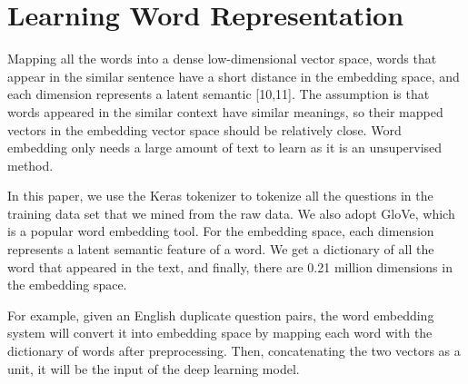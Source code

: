 	\section{Learning Word Representation }
	Mapping all the words into a dense low-dimensional vector space, words that appear in the similar sentence have a short distance in the embedding space, and each dimension represents a latent semantic [10,11]. The assumption is that words appeared in the similar context have similar meanings, so their mapped vectors in the embedding vector space should be relatively close. Word embedding only needs a large amount of text to learn as it is an unsupervised method. 
	\par 
	In this paper, we use the Keras tokenizer to tokenize all the questions in the training data set that we mined from the raw data. We also adopt GloVe, which is a popular word embedding tool. For the embedding space, each dimension represents a latent semantic feature of a word. We get a dictionary of all the word that appeared in the text, and finally, there are 0.21 million dimensions in the embedding space. 
	\par
	For example, given an English duplicate question pairs, the word embedding system will convert it into embedding space by mapping each word with the dictionary of words after preprocessing.  Then, concatenating the two vectors as a unit, it will be the input of the deep learning model.
	
